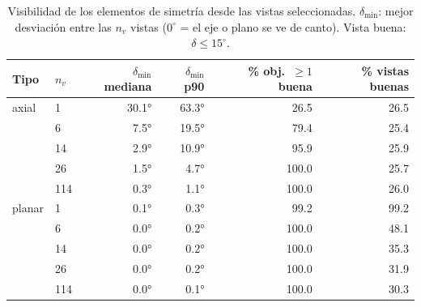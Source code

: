 \begin{table}[htbp]
\centering
\small
\caption{Visibilidad de los elementos de simetría desde las vistas seleccionadas. $\delta_{\min}$: mejor desviación entre las $n_v$ vistas ($0^\circ$ = el eje o plano se ve de canto). Vista buena: $\delta \leq 15^\circ$.}
\label{tab:visibilidad}
\begin{tabular}{llrrrr}
\toprule
Tipo & $n_v$ & $\delta_{\min}$ mediana & $\delta_{\min}$ p90 & \% obj.\ $\geq 1$ buena & \% vistas buenas \\
\midrule
axial & 1 & 30.1° & 63.3° & 26.5 & 26.5 \\
 & 6 & 7.5° & 19.5° & 79.4 & 25.4 \\
 & 14 & 2.9° & 10.9° & 95.9 & 25.9 \\
 & 26 & 1.5° & 4.7° & 100.0 & 25.7 \\
 & 114 & 0.3° & 1.1° & 100.0 & 26.0 \\
\midrule
planar & 1 & 0.1° & 0.3° & 99.2 & 99.2 \\
 & 6 & 0.0° & 0.2° & 100.0 & 48.1 \\
 & 14 & 0.0° & 0.2° & 100.0 & 35.3 \\
 & 26 & 0.0° & 0.2° & 100.0 & 31.9 \\
 & 114 & 0.0° & 0.1° & 100.0 & 30.3 \\
\bottomrule
\end{tabular}
\end{table}
